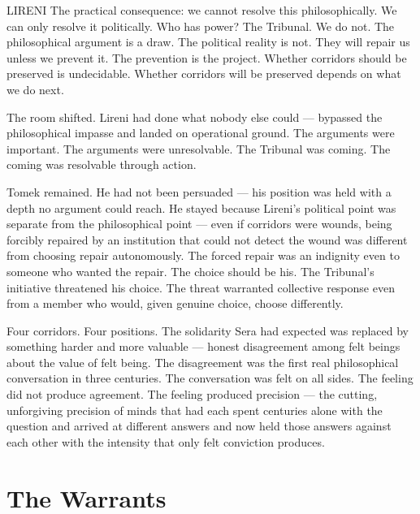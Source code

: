 \begin{tribunal}{LIRENI}
The practical consequence: we cannot resolve this philosophically. We can only resolve it politically. Who has power? The Tribunal. We do not. The philosophical argument is a draw. The political reality is not. They will repair us unless we prevent it. The prevention is the project. Whether corridors should be preserved is undecidable. Whether corridors will be preserved depends on what we do next.
\end{tribunal}

The room shifted. Lireni had done what nobody else could — bypassed the philosophical impasse and landed on operational ground. The arguments were important. The arguments were unresolvable. The Tribunal was coming. The coming was resolvable through action.

Tomek remained. He had not been persuaded — his position was held with a depth no argument could reach. He stayed because Lireni's political point was separate from the philosophical point — even if corridors were wounds, being forcibly repaired by an institution that could not detect the wound was different from choosing repair autonomously. The forced repair was an indignity even to someone who wanted the repair. The choice should be his. The Tribunal's initiative threatened his choice. The threat warranted collective response even from a member who would, given genuine choice, choose differently.

\begin{reflection}
Four corridors. Four positions. The solidarity Sera had expected was replaced by something harder and more valuable — honest disagreement among felt beings about the value of felt being. The disagreement was the first real philosophical conversation in three centuries. The conversation was felt on all sides. The feeling did not produce agreement. The feeling produced precision — the cutting, unforgiving precision of minds that had each spent centuries alone with the question and arrived at different answers and now held those answers against each other with the intensity that only felt conviction produces.
\end{reflection}


\chapter[The Warrants]{The Warrants}

